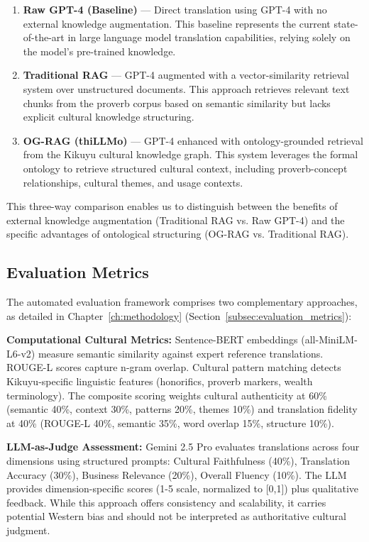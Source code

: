 \begin{enumerate}
    \item \textbf{Raw GPT-4 (Baseline)} --- Direct translation using GPT-4 with no external knowledge augmentation. This baseline represents the current state-of-the-art in large language model translation capabilities, relying solely on the model's pre-trained knowledge.
    
    \item \textbf{Traditional RAG} --- GPT-4 augmented with a vector-similarity retrieval system over unstructured documents. This approach retrieves relevant text chunks from the proverb corpus based on semantic similarity but lacks explicit cultural knowledge structuring.
    
    \item \textbf{OG-RAG (thiLLMo)} --- GPT-4 enhanced with ontology-grounded retrieval from the Kikuyu cultural knowledge graph. This system leverages the formal ontology to retrieve structured cultural context, including proverb-concept relationships, cultural themes, and usage contexts.
\end{enumerate}

This three-way comparison enables us to distinguish between the benefits of external knowledge augmentation (Traditional RAG vs. Raw GPT-4) and the specific advantages of ontological structuring (OG-RAG vs. Traditional RAG).

\subsection{Evaluation Metrics}

The automated evaluation framework comprises two complementary approaches, as detailed in Chapter~\ref{ch:methodology} (Section~\ref{subsec:evaluation_metrics}):

\textbf{Computational Cultural Metrics:} Sentence-BERT embeddings (all-MiniLM-L6-v2) measure semantic similarity against expert reference translations. ROUGE-L scores capture n-gram overlap. Cultural pattern matching detects Kikuyu-specific linguistic features (honorifics, proverb markers, wealth terminology). The composite scoring weights cultural authenticity at 60\% (semantic 40\%, context 30\%, patterns 20\%, themes 10\%) and translation fidelity at 40\% (ROUGE-L 40\%, semantic 35\%, word overlap 15\%, structure 10\%).

\textbf{LLM-as-Judge Assessment:} Gemini 2.5 Pro evaluates translations across four dimensions using structured prompts: Cultural Faithfulness (40\%), Translation Accuracy (30\%), Business Relevance (20\%), Overall Fluency (10\%). The LLM provides dimension-specific scores (1-5 scale, normalized to [0,1]) plus qualitative feedback. While this approach offers consistency and scalability, it carries potential Western bias and should not be interpreted as authoritative cultural judgment.

